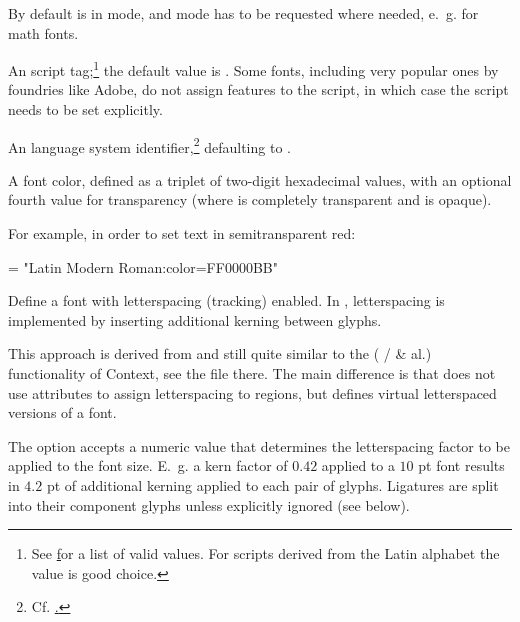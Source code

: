          By default  is in 
         mode, and  mode has to be requested where needed,
         e.~g. for math fonts.
  \endaltitem

   \label{script-tag}
         An \OpenType script tag;\footnote{%
           See \hyperlink {http://www.microsoft.com/typography/otspec/scripttags.htm}
           for a list of valid values.
           For scripts derived from the Latin alphabet the value
            is good choice.
         }
         the default value is .
         Some fonts, including very popular ones by foundries like Adobe,
         do not assign features to the  script, in
         which case the script needs to be set explicitly.
  \endaltitem

         An \OpenType language system identifier,\footnote{%
           Cf. \hyperlink {http://www.microsoft.com/typography/otspec/languagetags.htm}.
         }
         defaulting to .
  \endaltitem

         A font color, defined as a triplet of two-digit hexadecimal
          values, with an optional fourth value for
         transparency
         (where  is completely transparent and
          is opaque).

         For example, in order to set text in semitransparent red:

         \beginlisting
      \font \test = "Latin Modern Roman:color=FF0000BB"
         \endlisting
  \endaltitem

         Define a font with letterspacing (tracking) enabled.
         In , letterspacing is implemented by
         inserting additional kerning between glyphs.

         This approach is derived from and still quite similar to the
          ( /
          \& al.) functionality of
         Context, see the file  there.
         The main difference is that  does not
         use \LUATEX attributes to assign letterspacing to regions,
         but defines virtual letterspaced versions of a font.

         The option  accepts a numeric value that
         determines the letterspacing factor to be applied to the font
         size.
         E.~g. a kern factor of $0.42$ applied to a $10$ pt font
         results in $4.2$ pt of additional kerning applied to each
         pair of glyphs.
         Ligatures are split into their component glyphs unless
         explicitly ignored (see below).


